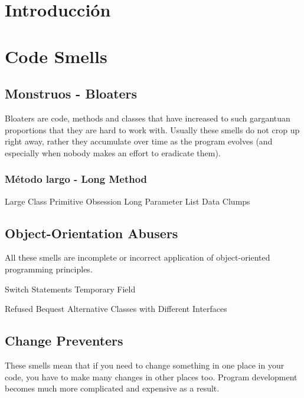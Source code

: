 \documentclass[11pt,a4paper,oneside]{book}
\begin{document}
\tableofcontents %
 
\chapter{Introducción}




\chapter{Code Smells}

\section{Monstruos - Bloaters}

Bloaters are code, methods and classes that have increased to such gargantuan proportions that they are hard to work with. Usually these smells do not crop up right away, rather they accumulate over time as the program evolves (and especially when nobody makes an effort to eradicate them).

\subsection{Método largo -   Long Method}
    Large Class
    Primitive Obsession
    Long Parameter List
    Data Clumps




\section{Object-Orientation Abusers}

All these smells are incomplete or incorrect application of object-oriented programming principles.

    Switch Statements
    Temporary Field

    Refused Bequest
    Alternative Classes with Different Interfaces





\section{Change Preventers}

These smells mean that if you need to change something in one place in your code, you have to make many changes in other places too. Program development becomes much more complicated and expensive as a result.
\end{document}
